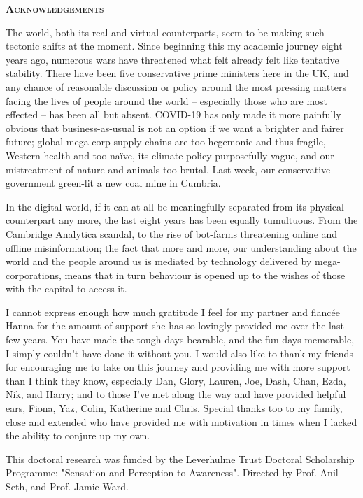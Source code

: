\pagestyle{empty}%
\begin{center}
	\Huge \textsc{\textbf{Acknowledgements}}
	\hrulefill
\end{center}

The world, both its real and virtual counterparts, seem to be making such tectonic shifts at the moment. Since beginning this my academic journey eight years ago, numerous wars have threatened what felt already felt like tentative stability. There have been five conservative prime ministers here in the UK, and any chance of reasonable discussion or policy around the most pressing matters facing the lives of people around the world -- especially those who are most effected -- has been all but absent. COVID-19 has only made it more painfully obvious that business-as-usual is not an option if we want a brighter and fairer future; global mega-corp supply-chains are too hegemonic and thus fragile, Western health and too naïve, its climate policy purposefully vague, and our mistreatment of nature and animals too brutal. Last week, our conservative government green-lit a new coal mine in Cumbria. 

In the digital world, if it can at all be meaningfully separated from its physical counterpart any more, the last eight years has been equally tumultuous. From the Cambridge Analytica scandal, to the rise of bot-farms threatening online and offline misinformation; the fact that more and more, our understanding about the world and the people around us is mediated by technology delivered by mega-corporations, means that in turn behaviour is opened up to the wishes of those with the capital to access it. 

I cannot express enough how much gratitude I feel for my partner and fiancée Hanna for the amount of support she has so lovingly provided me over the last few years. You have made the tough days bearable, and the fun days memorable, I simply couldn't have done it without you. I would also like to thank my friends for encouraging me to take on this journey and providing me with more support than I think they know, especially Dan, Glory, Lauren, Joe, Dash, Chan, Ezda, Nik, and Harry; and to those I've met along the way and have provided helpful ears, Fiona, Yaz, Colin, Katherine and Chris. Special thanks too to my family, close and extended who have provided me with motivation in times when I lacked the ability to conjure up my own.




This doctoral research was funded by the Leverhulme Trust Doctoral Scholarship Programme: "Sensation and Perception to Awareness". Directed by Prof. Anil Seth, and Prof. Jamie Ward.
